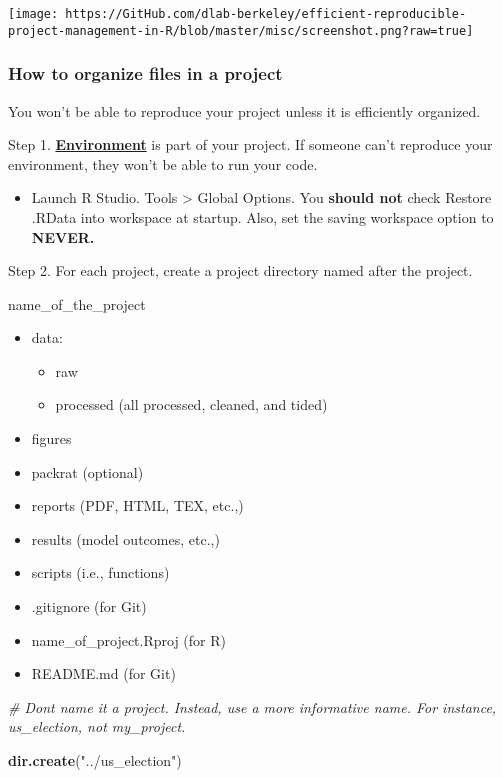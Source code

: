 \documentclass[
]{book}
\newenvironment{Shaded}{\begin{snugshade}}{\end{snugshade}}
\newcommand{\CommentTok}[1]{\textcolor[rgb]{0.56,0.35,0.01}{\textit{#1}}}
\newcommand{\KeywordTok}[1]{\textcolor[rgb]{0.13,0.29,0.53}{\textbf{#1}}}
\newcommand{\NormalTok}[1]{#1}
\newcommand{\StringTok}[1]{\textcolor[rgb]{0.31,0.60,0.02}{#1}}
\providecommand{\tightlist}{%
  \setlength{\itemsep}{0pt}\setlength{\parskip}{0pt}}
\begin{document}
\texttt{[image: https://GitHub.com/dlab-berkeley/efficient-reproducible-project-management-in-R/blob/master/misc/screenshot.png?raw=true]}

\hypertarget{how-to-organize-files-in-a-project}{%
\subsubsection{How to organize files in a project}\label{how-to-organize-files-in-a-project}}

You won't be able to reproduce your project unless it is efficiently organized.

Step 1. \href{https://environments.rstudio.com/}{\textbf{Environment}} is part of your project. If someone can't reproduce your environment, they won't be able to run your code.

\begin{itemize}
\tightlist
\item
  Launch R Studio. Tools \textgreater{} Global Options. You \textbf{should not} check Restore .RData into workspace at startup. Also, set the saving workspace option to \textbf{NEVER.}
\end{itemize}

Step 2. For each project, create a project directory named after the project.

name\_of\_the\_project

\begin{itemize}
\tightlist
\item
  data:

  \begin{itemize}
  \tightlist
  \item
    raw
  \item
    processed (all processed, cleaned, and tided)
  \end{itemize}
\item
  figures
\item
  packrat (optional)
\item
  reports (PDF, HTML, TEX, etc.,)
\item
  results (model outcomes, etc.,)
\item
  scripts (i.e., functions)
\item
  .gitignore (for Git)
\item
  name\_of\_project.Rproj (for R)
\item
  README.md (for Git)
\end{itemize}

\begin{Shaded}
\begin{Highlighting}[]
\CommentTok{\# Don\textquotesingle{}t name it a project. Instead, use a more informative name. For instance, \textasciigrave{}us\_election\textasciigrave{}, not \textasciigrave{}my\_project.\textasciigrave{}}

\KeywordTok{dir.create}\NormalTok{(}\StringTok{"../us\_election"}\NormalTok{)}
\end{Highlighting}
\end{Shaded}
\end{document}
